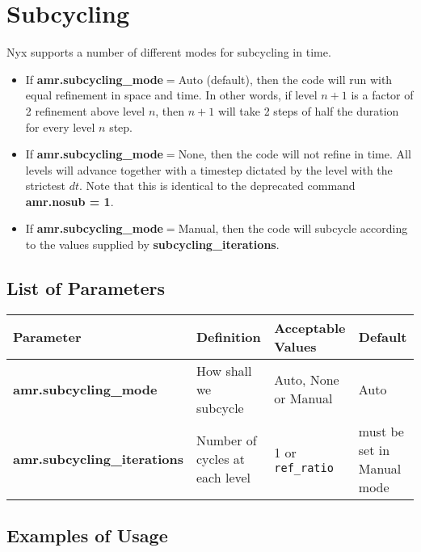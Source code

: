 \section{Subcycling}
Nyx supports a number of different modes for subcycling in time.

\begin{itemize}
\item If {\bf amr.subcycling\_mode}$ = $Auto (default), then the code 
will run with equal refinement in space and time. In other words, if 
level $n+1$ is a factor of 2 refinement above level $n$, then $n+1$ 
will take 2 steps of half the duration for every level $n$ step.

\item If {\bf amr.subcycling\_mode}$ = $None, then the code 
will not refine in time. All levels will advance together with a 
timestep dictated by the level with the strictest $dt$. Note that this 
is identical to the deprecated command {\bf amr.nosub = 1}.

\item If {\bf amr.subcycling\_mode}$ = $Manual, then the code will 
subcycle according to the values supplied by {\bf 
subcycling\_iterations}.

\end{itemize}

\subsection{List of Parameters}

\begin{table*}[h]
\begin{scriptsize}
\begin{center}
\begin{tabular}{|l|l|l|l|} \hline
Parameter & Definition & Acceptable Values &Default\\
\hline
{\bf amr.subcycling\_mode}& How shall we subcycle &Auto, None or Manual & Auto \\ 
{\bf amr.subcycling\_iterations} & Number of cycles at each level & 1 
or {\tt ref\_ratio} & must be set in Manual mode \\ 
\hline
\end{tabular}
\end{center}
\end{scriptsize}
\end{table*}

\subsection{Examples of Usage}

